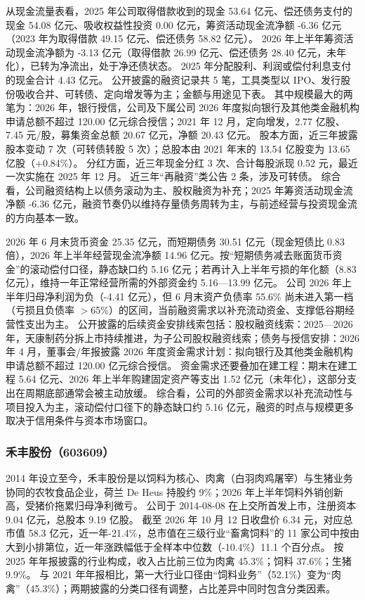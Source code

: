  从现金流量表看，2025 年公司取得借款收到的现金 53.64 亿元、偿还债务支付的现金 54.08 亿元、吸收权益性投资 0.00 亿元，筹资活动现金流净额 -6.36 亿元（2023 年为取得借款 49.15 亿元、偿还债务 58.82 亿元）。 2026 年上半年筹资活动现金流净额为 -3.13 亿元（取得借款 26.99 亿元、偿还债务 28.40 亿元，未年化），已转为净流出，处于净还债状态。 2025 年分配股利、利润或偿付利息支付的现金合计 4.43 亿元。 公开披露的融资记录共 5 笔，工具类型以 IPO、发行股份吸收合并、可转债、定向增发等为主；金额与用途见下表。 其中规模最大的两笔为：2026 年，银行授信，公司及下属公司 2026 年度拟向银行及其他类金融机构申请总额不超过 120.00 亿元综合授信；2021 年 12 月，定向增发，2.77 亿股、7.45 元/股，募集资金总额 20.67 亿元，净额 20.43 亿元。 股本方面，近三年披露股本变动 7 次（可转债转股 5 次）；总股本由 2021 年末的 13.54 亿股变为 13.65 亿股（+0.84\%）。 分红方面，近三年现金分红 3 次、合计每股派现 0.52 元，最近一次实施在 2025 年 12 月。 近三年“再融资”类公告 2 条，涉及可转债。 综合看，公司融资结构上以债务滚动为主、股权融资为补充；2025 年筹资活动现金流净额 -6.36 亿元，融资节奏仍以维持存量债务周转为主，与前述经营与投资现金流的方向基本一致。

 2026 年 6 月末货币资金 25.35 亿元，而短期债务 30.51 亿元（现金短债比 0.83 倍），2026 年上半年经营现金流净额 14.96 亿元。按“短期债务减去账面货币资金”的滚动偿付口径，静态缺口约 5.16 亿元；若再计入上半年亏损的年化额（8.83 亿元），维持一年正常经营所需的外部资金约 5.16---13.99 亿元。 公司 2026 年上半年归母净利润为负（-4.41 亿元），但 6 月末资产负债率 55.6\% 尚未进入第一档（亏损且负债率 $>$65\%）的区间，当前融资需求以补充流动资金、支撑低谷期经营性支出为主。 公开披露的后续资金安排线索包括：股权融资线索：2025---2026 年，天康制药分拆上市持续推进，为子公司股权融资线索；债务与授信安排：2026 年 4 月，董事会/年报披露 2026 年度资金需求计划：拟向银行及其他类金融机构申请总额不超过 120.00 亿元综合授信。 资金需求还要叠加在建工程：期末在建工程 5.64 亿元、2026 年上半年购建固定资产等支出 1.52 亿元（未年化），这部分支出在周期底部通常会被主动放缓。 综合看，公司的外部资金需求以补充流动性与项目投入为主，滚动偿付口径下的静态缺口约 5.16 亿元，融资的时点与规模更多取决于信用条件与资本市场窗口。




\subsubsection{禾丰股份（603609）}
\label{co:603609}

 2014 年设立至今，禾丰股份是以饲料为核心、肉禽（白羽肉鸡屠宰）与生猪业务协同的农牧食品企业，荷兰 De Heus 持股约 9\%；2026 年上半年饲料外销创新高，受猪价拖累归母净利微亏。 公司于 2014-08-08 在上交所首发上市，注册资本 9.04 亿元，总股本 9.19 亿股。 截至 2026 年 10 月 12 日收盘价 6.34 元，对应总市值 58.3 亿元，近一年-21.4\%，总市值在三级行业“畜禽饲料”的 11 家公司中按由大到小排第位，近一年涨跌幅低于全样本中位数（-10.4\%）11.1 个百分点。 按 2025 年年报披露的行业构成，收入占比前三位为肉禽 45.3\%；饲料 37.6\%；生猪 9.9\%。 与 2021 年年报相比，第一大行业口径由“饲料业务”（52.1\%）变为“肉禽”（45.3\%）；两期披露的分类口径有调整，占比差异中同时包含分类因素。

